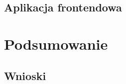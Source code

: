 \documentclass[twoside,a4paper]{report}
\begin{document}
\section{Aplikacja frontendowa}


\chapter{Podsumowanie}
\section{Wnioski}


\listoffigures
\lstlistoflistings

\printbibliography
% 
% 

\end{document}
